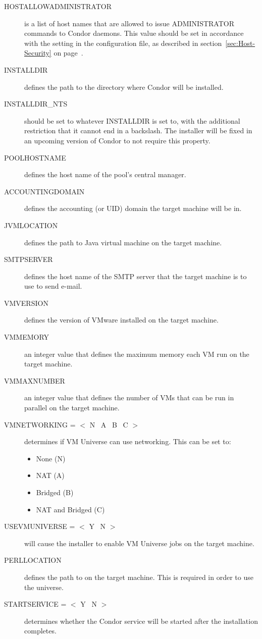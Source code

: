 \begin{description}
\item[HOSTALLOWADMINISTRATOR]
is a list of host names that are allowed to issue ADMINISTRATOR commands to
Condor daemons. This value should be set in accordance with the
 setting in the configuration file, 
as described in
section~\ref{sec:Host-Security} on page~\pageref{sec:Host-Security}.

\item[INSTALLDIR]
defines the path to the directory where Condor will be installed. 

\item[INSTALLDIR\_NTS]
should be set to whatever INSTALLDIR is set to, with the additional
restriction that it cannot end in a backslash. The installer will be fixed
in an upcoming version of Condor to not require this property.

\item[POOLHOSTNAME]
defines the host name of the pool's central manager. 

\item[ACCOUNTINGDOMAIN] 
defines the accounting (or UID) domain the target machine will be in.

\item[JVMLOCATION]
defines the path to Java virtual machine on the target machine.

\item[SMTPSERVER]
defines the host name of the SMTP server that the target machine is to
use to send e-mail.

\item [VMVERSION]
defines the version of VMware installed on the target machine.

\item [VMMEMORY]
an integer value that defines the maximum memory each VM run on the target
machine.

\item [VMMAXNUMBER]
an integer value that defines the number of VMs that can be run in parallel
on the target machine.

\item [VMNETWORKING = $<$ N \Bar\ A \Bar\ B \Bar\ C $>$]
determines if VM Universe can use networking. This can be set to:
\begin{itemize}
\item None (N)
\item NAT (A)
\item Bridged (B)
\item NAT and Bridged (C)
\end{itemize}

\item [USEVMUNIVERSE = $<$ Y \Bar\ N $>$]
will cause the installer to enable VM Universe jobs on the target machine.


\item[PERLLOCATION]
defines the path to  on the target machine. This is required in
order to use the  universe.

\item [STARTSERVICE = $<$ Y \Bar\ N $>$]
determines whether the Condor service will be started after the installation
completes.
\end {description}

